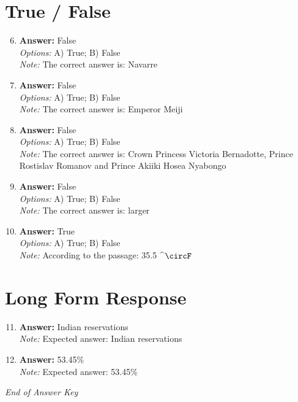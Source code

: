\documentclass[12pt]{article}
\begin{document}
\section*{True / False}
\begin{enumerate}[label=\arabic*.]
\setcounter{enumi}{5}
\item \textbf{Answer:} False
\\ \textit{Options:} A) True; B) False
\\ \textit{Note:} The correct answer is: Navarre
\item \textbf{Answer:} False
\\ \textit{Options:} A) True; B) False
\\ \textit{Note:} The correct answer is: Emperor Meiji
\item \textbf{Answer:} False
\\ \textit{Options:} A) True; B) False
\\ \textit{Note:} The correct answer is: Crown Princess Victoria Bernadotte, Prince Rostislav Romanov and Prince Akiiki Hosea Nyabongo
\item \textbf{Answer:} False
\\ \textit{Options:} A) True; B) False
\\ \textit{Note:} The correct answer is: larger
\item \textbf{Answer:} True
\\ \textit{Options:} A) True; B) False
\\ \textit{Note:} According to the passage: 35.5 ^\ensuremath{\circF}
\end{enumerate}

\section*{Long Form Response}
\begin{enumerate}[label=\arabic*.]
\setcounter{enumi}{10}
\item \textbf{Answer:} Indian reservations
\\ \textit{Note:} Expected answer: Indian reservations
\item \textbf{Answer:} 53.45\%
\\ \textit{Note:} Expected answer: 53.45\%
\end{enumerate}

\vfill
\noindent\textit{End of Answer Key}
\end{document}
